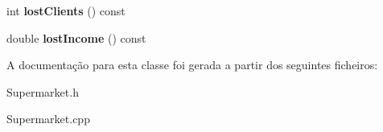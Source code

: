 \begin{DoxyCompactItemize}
\item 
\hypertarget{classSupermarket_af6a5e90ac46538a43854c562d75e763a}{int {\bfseries lost\-Clients} () const }\label{d7/de9/classSupermarket_af6a5e90ac46538a43854c562d75e763a}

\item 
\hypertarget{classSupermarket_a19d1badd6c3efe2dfa719e02a644051f}{double {\bfseries lost\-Income} () const }\label{d7/de9/classSupermarket_a19d1badd6c3efe2dfa719e02a644051f}

\end{DoxyCompactItemize}


A documentação para esta classe foi gerada a partir dos seguintes ficheiros\-:\begin{DoxyCompactItemize}
\item 
Supermarket.\-h\item 
Supermarket.\-cpp\end{DoxyCompactItemize}
